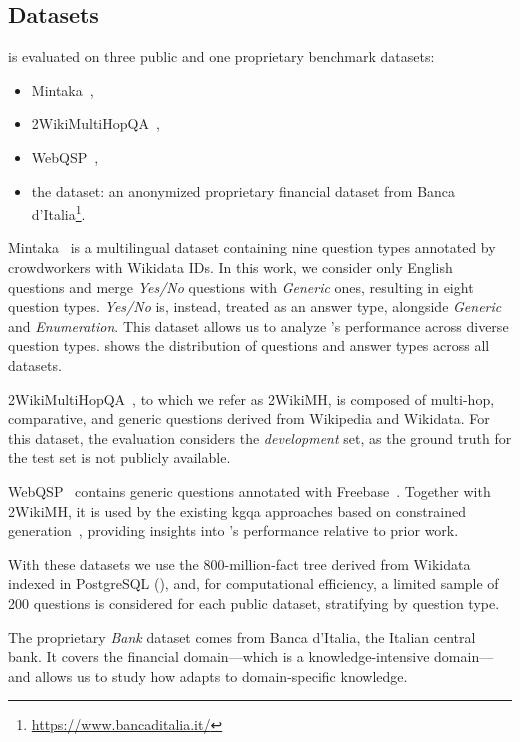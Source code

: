 \subsection{Datasets}
 is evaluated on three public and one proprietary benchmark datasets:
\begin{itemize}
    \item Mintaka~\cite{sen-etal-2022-mintaka},
    \item 2WikiMultiHopQA~\cite{ho-etal-2020-constructing},
    \item WebQSP~\cite{yih-etal-2016-value},
    \item the  dataset: an anonymized proprietary financial dataset from Banca d'Italia\footnote{\url{https://www.bancaditalia.it/}}.
\end{itemize}

Mintaka~\cite{sen-etal-2022-mintaka} is a multilingual dataset containing nine question types annotated by crowdworkers with Wikidata IDs. In this work, we consider only English questions and merge \textit{Yes/No} questions with \textit{Generic} ones, resulting in eight question types.
\textit{Yes/No} is, instead, treated as an answer type, alongside \textit{Generic} and \textit{Enumeration}.
This dataset allows us to analyze 's performance across diverse question types.
 shows the distribution of questions and answer types across all datasets. 

2WikiMultiHopQA~\cite{ho-etal-2020-constructing}, to which we refer as 2WikiMH, is composed of multi-hop, comparative, and generic questions derived from Wikipedia and Wikidata. For this dataset, the evaluation considers the \textit{development} set, as the ground truth for the test set is not publicly available.

WebQSP~\cite{yih-etal-2016-value} contains generic questions annotated with Freebase~\cite{freebase_2008}.
Together with 2WikiMH, it is used by the existing \ac{kgqa} approaches based on constrained generation~\cite{li-etal-2025-decoding-graphs,luo2024graphconstrainedreasoningfaithfulreasoning}, providing insights into 's performance relative to prior work.

With these datasets we use the 800-million-fact tree derived from Wikidata indexed in PostgreSQL (), and, for computational efficiency, a limited sample of 200 questions is considered for each public dataset, stratifying by question type.

\medskip\noindent
The proprietary \textit{Bank} dataset comes from Banca d'Italia, the Italian central bank. It covers the financial domain---which is a knowledge-intensive domain---and allows us to study how  adapts to domain-specific knowledge.

